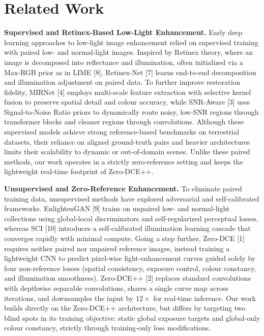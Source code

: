 \documentclass[11pt, letterpaper]{article}
\begin{document}
\section{Related Work}

\textbf{Supervised and Retinex-Based Low-Light Enhancement.} Early deep learning
approaches to low-light image enhancement relied on supervised training with
paired low- and normal-light images. Inspired by Retinex theory, where an image is
decomposed into reflectance and illumination, often initialized via a Max-RGB prior
as in LIME [8], Retinex-Net [7] learns end-to-end decomposition and illumination
adjustment on paired data. To further improve restoration fidelity, MIRNet [4]
employs multi-scale feature extraction with selective kernel fusion to preserve
spatial detail and colour accuracy, while SNR-Aware [3] uses Signal-to-Noise Ratio
priors to dynamically route noisy, low-SNR regions through transformer blocks and
cleaner regions through convolutions. Although these supervised models achieve
strong reference-based benchmarks on terrestrial datasets, their reliance on
aligned ground-truth pairs and heavier architectures limits their scalability to
dynamic or out-of-domain scenes. Unlike these paired methods, our work operates in
a strictly zero-reference setting and keeps the lightweight real-time footprint of
Zero-DCE++.

\textbf{Unsupervised and Zero-Reference Enhancement.} To eliminate paired training
data, unsupervised methods have explored adversarial and self-calibrated
frameworks. EnlightenGAN [9] trains on unpaired low- and normal-light collections
using global-local discriminators and self-regularized perceptual losses, whereas
SCI [10] introduces a self-calibrated illumination learning cascade that converges
rapidly with minimal compute. Going a step further, Zero-DCE [1] requires neither
paired nor unpaired reference images, instead training a lightweight CNN to predict
pixel-wise light-enhancement curves guided solely by four non-reference losses
(spatial consistency, exposure control, colour constancy, and illumination
smoothness). Zero-DCE++ [2] replaces standard convolutions with depthwise separable
convolutions, shares a single curve map across iterations, and downsamples the
input by $12\times$ for real-time inference. Our work builds directly on the
Zero-DCE++ architecture, but differs by targeting two blind spots in its training
objective: static global exposure targets and global-only colour constancy,
strictly through training-only loss modifications.
\end{document}
